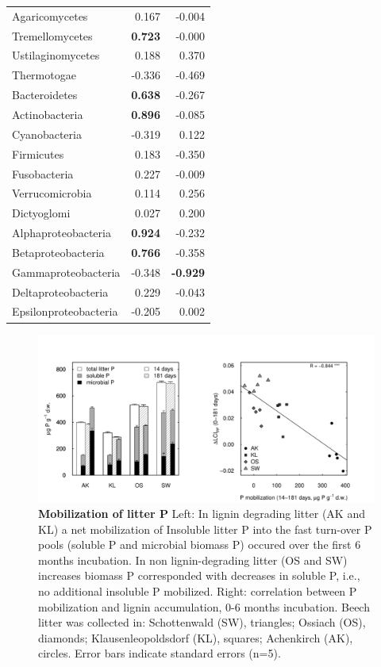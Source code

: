 \documentclass[10pt]{article}
\begin{document}
\begin{flushleft}
\begin{table}[h!]
{\begin{tabular}{lrr}
  Agaricomycetes & 0.167 & -0.004 \\ 
  Tremellomycetes & \textbf{ 0.723 } & -0.000 \\ 
  Ustilaginomycetes & 0.188 & 0.370 \\ 
  Thermotogae & -0.336 & -0.469 \\ 
  Bacteroidetes & \textbf{ 0.638 } & -0.267 \\ 
  Actinobacteria & \textbf{ 0.896 } & -0.085 \\ 
  Cyanobacteria & -0.319 & 0.122 \\ 
  Firmicutes & 0.183 & -0.350 \\ 
  Fusobacteria & 0.227 & -0.009 \\ 
  Verrucomicrobia & 0.114 & 0.256 \\ 
  Dictyoglomi & 0.027 & 0.200 \\ 
  Alphaproteobacteria & \textbf{ 0.924 } & -0.232 \\ 
  Betaproteobacteria & \textbf{ 0.766 } & -0.358 \\ 
  Gammaproteobacteria & -0.348 & \textbf{ -0.929 } \\ 
  Deltaproteobacteria & 0.229 & -0.043 \\ 
  Epsilonproteobacteria & -0.205 & 0.002 \\ 
   \hline
\end{tabular}
}
\end{table}
\begin{figure}[!h]
\begin{center}
\includegraphics{ligpaper-figphos}
\end{center}
\caption{
{\bf Mobilization of litter P} Left: In lignin degrading litter (AK and KL) a net mobilization of Insoluble litter P into the fast turn-over P pools (soluble P and microbial biomass P) occured over the first 6 months incubation. In non lignin-degrading litter (OS and SW) increases biomass P corresponded with decreases in soluble P, i.e., no additional insoluble P mobilized. Right: correlation between P mobilization and lignin accumulation, 0-6 months incubation. Beech litter was collected in: Schottenwald (SW), triangles; Ossiach (OS), diamonds; Klausenleopoldsdorf (KL), squares; Achenkirch (AK), circles. Error bars indicate standard errors (n=5).}
\end{figure}


\end{flushleft}
\end{document}
